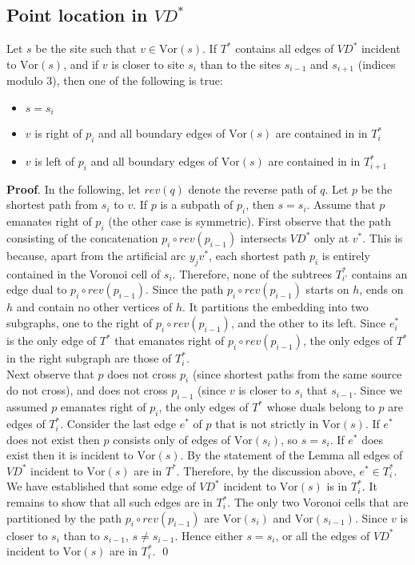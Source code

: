 \subsection{Point location in $VD^*$}\label{a1}
\begin{lemma}
  Let $s$ be the site such that $v\in \text{Vor}(s)$. If $T^*$ contains all edges of
  $VD^*$ incident to $\text{Vor}(s)$, and if $v$ is closer to site $s_i$ than to the
  sites $s_{i-1}$ and $s_{i+1}$ (indices modulo $3$), then one of the following is true:
  \begin{itemize}
    \item $s=s_i$
    \item $v$ is right of $p_i$ and all boundary edges of $\text{Vor}(s)$ are contained
      in in $T_i^*$
    \item $v$ is left of $p_i$ and all boundary edges of $\text{Vor}(s)$ are contained
      in in $T_{i+1}^*$
  \end{itemize}
\end{lemma}
\textbf{Proof}. In the following, let $rev(q)$ denote the reverse path of $q$.
\indent Let $p$ be the shortest path from $s_i$ to $v$. If $p$ is a subpath of $p_i$,
then $s=s_i$. Assume that $p$ emanates right of $p_i$ (the other case is symmetric).
First observe that the path consisting of the concatenation $p_i \circ rev(p_{i-1})$
intersects $VD^*$ only at $v^*$. This is because, apart from the artificial arc $y_jv^*$,
each shortest path $p_i$ is entirely contained in the Voronoi cell of $s_i$. Therefore,
none of the subtrees $T_{i'}^*$ contains an edge dual to $p_i \circ rev(p_{i-1})$. Since
the path $p_i \circ rev(p_{i-1})$ starts on $h$, ends on $h$ and contain no other
vertices of $h$. It partitions the embedding into two subgraphs, one to the right of $p_i
\circ rev(p_{i-1})$, and the other to its left. Since $e_i^*$ is the only edge of $T^*$
that emanates right of $p_i\circ rev(p_{i-1})$, the only edges of $T^*$ in the right
subgraph are those of $T_i^*$. \\
Next observe that $p$ does not cross $p_i$ (since shortest paths from the same source do
not cross), and does not cross $p_{i-1}$ (since $v$ is closer to $s_i$ that $s_{i-1}$.
Since we assumed $p$ emanates right of $p_i$, the only edges of $T^*$ whose duals belong
to $p$ are edges of $T_i^*$. Consider the last edge $e^*$ of $p$ that is not strictly in
$\text{Vor}(s)$. If $e^*$ does not exist then $p$ consists only of edges of
$\text{Vor}(s_{i})$, so $s=s_i$. If $e^*$ does exist then it is incident to
$\text{Vor}(s)$. By the statement of the Lemma all edges of $VD^*$ incident to
$\text{Vor}(s)$ are in $T^*$. Therefore, by the discussion above, $e^*\in T_i^*$. We have
established that some edge of $VD^*$ incident to $\text{Vor}(s)$ is in $T_i^*$. It
remains to show that all such edges are in $T_i^*$. The only two Voronoi cells that are
partitioned by the path $p_i\circ rev(p_{i-1})$ are $\text{Vor}(s_i)$ and
$\text{Vor}(s_{i-1})$. Since $v$ is closer to $s_i$ than to $s_{i-1}$, $s\neq s_{i-1}$.
Hence either $s=s_i$, or all the edges of $VD^*$ incident to $\text{Vor}(s)$ are in
$T_i^*$. \qed
